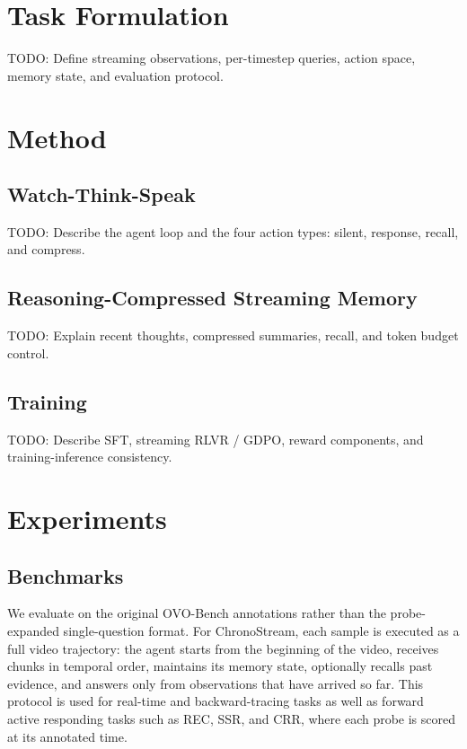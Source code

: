 \documentclass[11pt]{article}
\begin{document}
\section{Task Formulation}

TODO: Define streaming observations, per-timestep queries, action space, memory state, and evaluation protocol.

\section{Method}

\subsection{Watch-Think-Speak}

TODO: Describe the agent loop and the four action types: silent, response, recall, and compress.

\subsection{Reasoning-Compressed Streaming Memory}

TODO: Explain recent thoughts, compressed summaries, recall, and token budget control.

\subsection{Training}

TODO: Describe SFT, streaming RLVR / GDPO, reward components, and training-inference consistency.

\section{Experiments}

\subsection{Benchmarks}

We evaluate on the original OVO-Bench annotations rather than the probe-expanded single-question format.
For ChronoStream, each sample is executed as a full video trajectory: the agent starts from the beginning of the video, receives chunks in temporal order, maintains its memory state, optionally recalls past evidence, and answers only from observations that have arrived so far.
This protocol is used for real-time and backward-tracing tasks as well as forward active responding tasks such as REC, SSR, and CRR, where each probe is scored at its annotated time.
\end{document}
